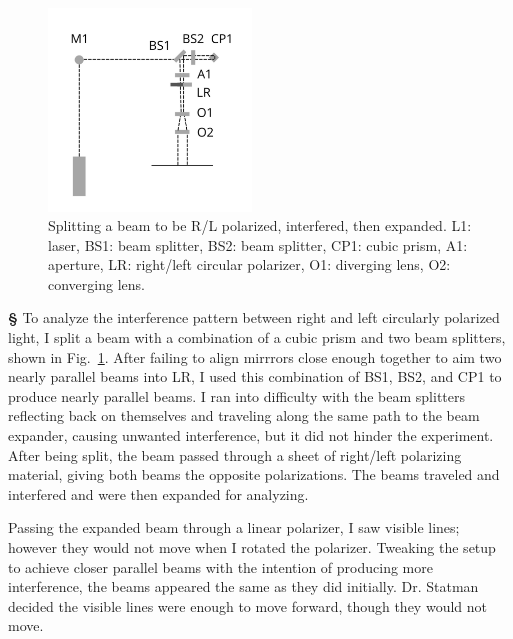 \documentclass[12pt]{article}
\begin{document}
\newpage
\noindent
\begin{figure}
  \begin{center}
    \includegraphics[width=0.48\textwidth]{E5}
  \end{center}
  \caption{Splitting a beam to be R/L polarized, interfered, then expanded. L1: laser, BS1: beam splitter, BS2: beam splitter, CP1: cubic prism, A1: aperture, LR: right/left circular polarizer, O1: diverging lens, O2: converging lens.}\label{E5}
\end{figure}
\large{\textbf{\S}}
To analyze the interference pattern between right and left circularly polarized light, I split a beam with a combination of a cubic prism and two beam splitters, shown in Fig.~\ref{E5}. After failing to align mirrrors close enough together to aim two nearly parallel beams into LR, I used this combination of BS1, BS2, and CP1 to produce nearly parallel beams. I ran into difficulty with the beam splitters reflecting back on themselves and traveling along the same path to the beam expander, causing unwanted interference, but it did not hinder the experiment. After being split, the beam passed through a sheet of right/left polarizing material, giving both beams the opposite polarizations. The beams traveled and interfered and were then expanded for analyzing.

Passing the expanded beam through a linear polarizer, I saw visible lines; however they would not move when I rotated the polarizer. Tweaking the setup to achieve closer parallel beams with the intention of producing more interference, the beams appeared the same as they did initially. Dr. Statman decided the visible lines were enough to move forward, though they would not move.
\end{document}
